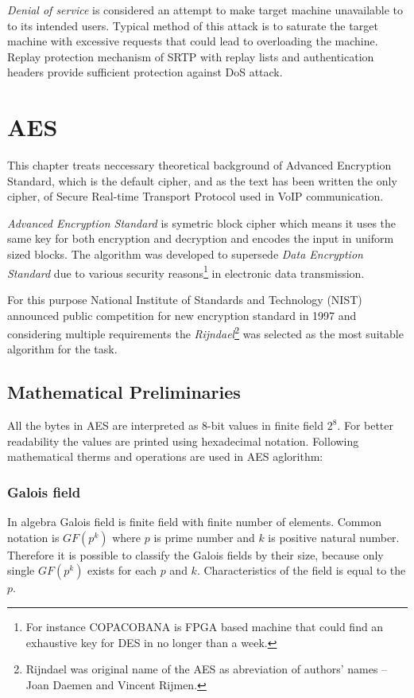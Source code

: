 \textit{Denial of service} is considered an attempt to make target machine 
unavailable to to its intended users. Typical method of this attack is to 
saturate the target machine with excessive requests that could lead to 
overloading the machine. Replay protection mechanism of SRTP with replay lists 
and authentication headers provide sufficient protection against DoS 
attack\cite{rfc3711, cisco:srtp}.

\section{AES}
This chapter treats neccessary theoretical background of Advanced Encryption 
Standard, which is the default cipher, and as the text has been written the only
cipher, of Secure Real-time Transport Protocol used in VoIP communication.

\textit{Advanced Encryption Standard} is symetric block cipher which means 
it uses the same key for both encryption and decryption and encodes the
input in uniform sized blocks. The algorithm was developed to supersede
\textit{Data Encryption Standard} due to various security reasons\footnote
{ For instance COPACOBANA is FPGA based machine that could find 
an exhaustive key for DES in no longer than a week\cite{copacobana}.} in 
electronic data transmission. 

For this purpose National Institute of Standards and Technology (NIST)
announced public competition for new encryption standard in 1997 and 
considering multiple requirements the \textit{Rijndael}\footnote{ Rijndael
was original name of the AES as abreviation of authors' names -- Joan 
Daemen and Vincent Rijmen.} was selected as the most suitable algorithm
for the task\cite{AES-FIPS}. 

\subsection{Mathematical Preliminaries}
All the bytes in AES are interpreted as 8-bit values in finite field $2^8$.
For better readability the values are printed using hexadecimal notation.
Following mathematical therms and operations are used in AES aglorithm:

\subsubsection*{Galois field}
In algebra Galois field is finite field with finite number of elements.
Common notation is $GF(p^k)$ where $p$ is prime number and $k$ is positive
natural number. Therefore it is possible to classify the Galois fields 
by their size, because only single $GF(p^k)$ exists for each $p$ and $k$.
Characteristics of the field is equal to the $p$.

